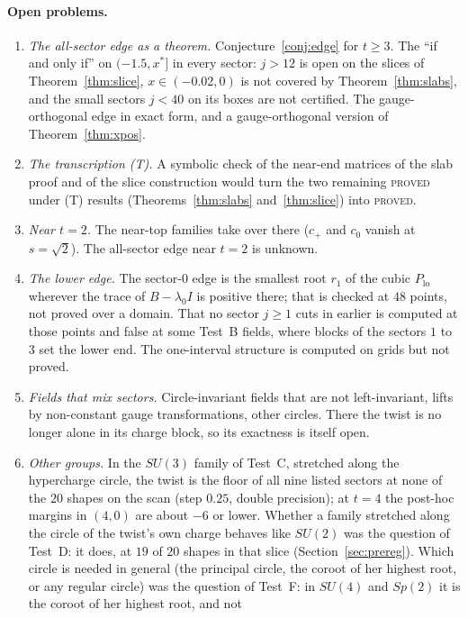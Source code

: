 \documentclass[11pt]{article}
\theoremstyle{definition}
\theoremstyle{remark}
\newcommand{\PROVED}{\textsc{proved}}
\newcommand{\PROVEDT}{\textsc{proved} under (T)}
\begin{document}
\paragraph{Open problems.}
\begin{enumerate}
  \item \emph{The all-sector edge as a theorem.} Conjecture~\ref{conj:edge} for $t\ge3$. The ``if and only if'' on
  $(-1.5,x^*]$ in every sector: $j>12$ is open on the slices of Theorem~\ref{thm:slice}, $x\in(-0.02,0)$ is not covered by
  Theorem~\ref{thm:slabs}, and the small sectors $j<40$ on its boxes are not certified. The gauge-orthogonal edge in exact
  form, and a gauge-orthogonal version of Theorem~\ref{thm:xpos}.
  \item \emph{The transcription (T).} A symbolic check of the near-end matrices of the slab proof and of the slice
  construction would turn the two remaining \PROVEDT{} results (Theorems~\ref{thm:slabs} and~\ref{thm:slice}) into \PROVED.
  \item \emph{Near $t=2$.} The near-top families take over there ($c_+$ and $c_0$ vanish at $s=\sqrt2$). The all-sector edge
  near $t=2$ is unknown.
  \item \emph{The lower edge.} The sector-$0$ edge is the smallest root $r_1$ of the cubic $P_{\mathrm{lo}}$ wherever the
  trace of $B-\lambda_0I$ is positive there; that is checked at $48$ points, not proved over a domain. That no sector
  $j\ge1$ cuts in earlier is computed at those points and false at some Test~B fields, where blocks of the sectors $1$ to
  $3$ set the lower end. The one-interval structure is computed on grids but not proved.
  \item \emph{Fields that mix sectors.} Circle-invariant fields that are not left-invariant, lifts by non-constant gauge
  transformations, other circles. There the twist is no longer alone in its charge block, so its exactness is itself open.
  \item \emph{Other groups.} In the $SU(3)$ family of Test~C, stretched along the hypercharge circle, the twist is the
  floor of all nine listed sectors at none of the $20$ shapes on the scan (step $0.25$, double precision); at $t=4$ the
  post-hoc margins in $(4,0)$ are about $-6$ or lower. Whether a family stretched along the circle of the twist's own
  charge behaves like $SU(2)$ was the question of Test~D: it does, at $19$ of $20$ shapes in that slice
  (Section~\ref{sec:prereg}). Which circle is needed in general (the principal circle, the coroot of her highest root, or
  any regular circle) was the question of Test~F: in $SU(4)$ and $Sp(2)$ it is the coroot of her highest root, and not

\end{enumerate}
\end{document}
